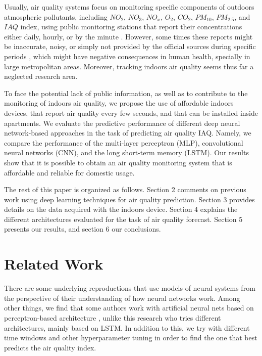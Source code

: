 \documentclass{llncs}
\begin{document}
Usually, air quality systems focus on monitoring specific components of outdoors atmospheric pollutants,
including $NO_{2}$, $NO_{3}$, $NO_{x}$, $O_{2}$, $CO_{2}$, $PM_{10}$, 
$PM_{2.5}$, and $IAQ$ index, using public monitoring stations that report their concentrations
either daily, hourly, or by the minute \cite{bme680}. However, some times
these reports might be inaccurate, noisy, or simply not provided by the
official sources during specific periods \cite{nom156}, which might have
negative consequences in human health, specially in large metropolitan
areas. Moreover, tracking indoors air quality seems thus far a 
neglected research area.

To face the potential lack of public information, as well as to contribute to the monitoring of indoors air quality, we propose the use of
affordable indoors devices, that report air quality every few seconds,
and that can be installed inside apartments. We evaluate the predictive
performance of different deep neural network-based
approaches in the task of predicting air quality IAQ. Namely, we compare
the performance of the multi-layer perceptron (MLP), convolutional neural
networks (CNN), and the long short-term memory (LSTM). Our results show
that it is possible to obtain an air quality monitoring system that is
affordable and reliable for domestic usage.

The rest of this paper is organized as follows. Section 2 comments on
previous work using deep learning techniques for air quality prediction.
Section 3 provides details on the data acquired with the indoors device.
Section 4 explains the different architectures evaluated for the task of
air quality forecast. Section 5 presents our results, and section 6 our
conclusions.

    \hypertarget{related-work}{%
\section{Related Work}\label{related-work}}

There are some underlying reproductions that use models of neural
systems from the perspective of their understanding of how neural
networks work. Among other things, we find that some authors work with
artificial neural nets based on perceptron-based architecture 
\cite{ghazali}, unlike this research who tries different architectures, 
mainly based on LSTM. In addition to this, we try with different 
time windows and other hyperparameter tuning in order to find the
one that best predicts the air quality index.
\end{document}
